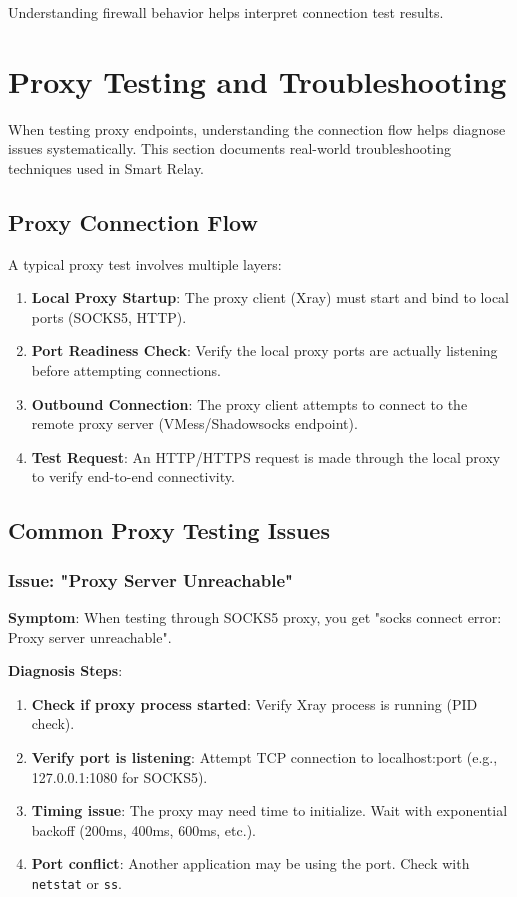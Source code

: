Understanding firewall behavior helps interpret connection test results.

\section{Proxy Testing and Troubleshooting}

When testing proxy endpoints, understanding the connection flow helps diagnose issues systematically. This section documents real-world troubleshooting techniques used in Smart Relay.

\subsection{Proxy Connection Flow}

A typical proxy test involves multiple layers:

\begin{enumerate}
    \item \textbf{Local Proxy Startup}: The proxy client (Xray) must start and bind to local ports (SOCKS5, HTTP).
    \item \textbf{Port Readiness Check}: Verify the local proxy ports are actually listening before attempting connections.
    \item \textbf{Outbound Connection}: The proxy client attempts to connect to the remote proxy server (VMess/Shadowsocks endpoint).
    \item \textbf{Test Request}: An HTTP/HTTPS request is made through the local proxy to verify end-to-end connectivity.
\end{enumerate}

\subsection{Common Proxy Testing Issues}

\subsubsection{Issue: "Proxy Server Unreachable"}

\textbf{Symptom}: When testing through SOCKS5 proxy, you get "socks connect error: Proxy server unreachable".

\textbf{Diagnosis Steps}:
\begin{enumerate}
    \item \textbf{Check if proxy process started}: Verify Xray process is running (PID check).
    \item \textbf{Verify port is listening}: Attempt TCP connection to localhost:port (e.g., 127.0.0.1:1080 for SOCKS5).
    \item \textbf{Timing issue}: The proxy may need time to initialize. Wait with exponential backoff (200ms, 400ms, 600ms, etc.).
    \item \textbf{Port conflict}: Another application may be using the port. Check with \texttt{netstat} or \texttt{ss}.
\end{enumerate}

